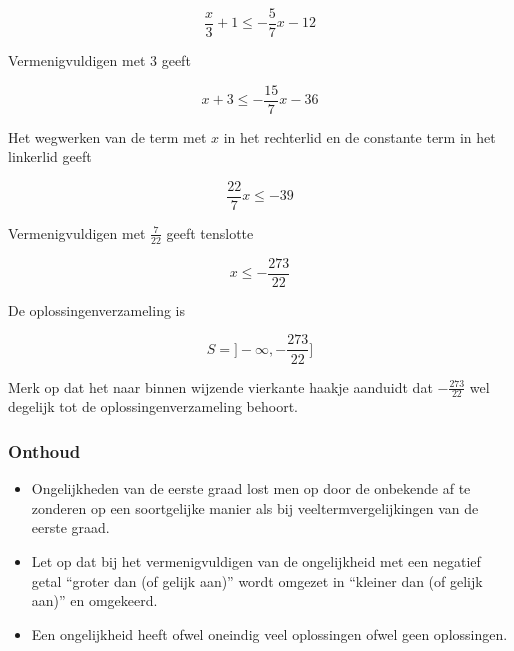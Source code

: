 \[ \frac{x}{3}+1 \leq -\frac{5}{7}x-12 \]

Vermenigvuldigen met $3$ geeft

\[ x+3 \leq -\frac{15}{7}x-36 \]

Het wegwerken van de term met $x$ in het rechterlid en de constante term in het linkerlid geeft

\[ \frac{22}{7}x \leq -39 \]

Vermenigvuldigen met $\frac{7}{22}$ geeft tenslotte

\[ x \leq -\frac{273}{22} \]

De oplossingenverzameling is

\[ S=]-\infty, -\frac{273}{22} ] \]

Merk op dat het naar binnen wijzende vierkante haakje aanduidt dat $-\frac{273}{22}$ wel degelijk tot de oplossingenverzameling behoort.

\subsubsection{Onthoud}

\begin{framed}
\begin{itemize}
\item Ongelijkheden van de eerste graad lost men op door de onbekende af te zonderen op een soortgelijke manier als bij veeltermvergelijkingen van de eerste graad.
\item Let op dat bij het vermenigvuldigen van de ongelijkheid met een negatief getal ``groter dan (of gelijk aan)'' wordt omgezet in ``kleiner dan (of gelijk aan)'' en omgekeerd.
\item Een ongelijkheid heeft ofwel oneindig veel oplossingen ofwel geen oplossingen.
\end{itemize}
\end{framed}
